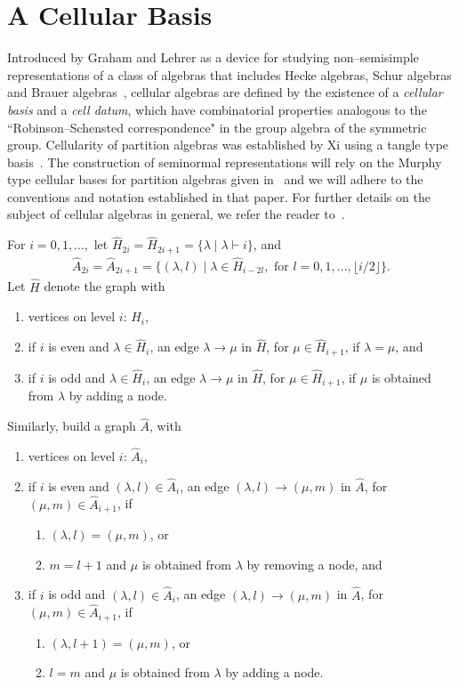 \documentclass[11pt,a4paper,reqno,svgnames]{amsart}
\theoremstyle{plain}
\theoremstyle{definition}
\numberwithin{equation}{section}
\begin{document}
\section{A Cellular Basis}\label{m-b-s}
Introduced by Graham and Lehrer as a device for studying non--semisimple representations of a class of algebras that includes Hecke algebras, Schur algebras and Brauer algebras~\cite{MR1376244}, cellular algebras are defined by the existence of a \emph{cellular basis} and a \emph{cell datum}, which have combinatorial properties analogous to the ``Robinson--Schensted correspondence" in the group algebra of the symmetric group. Cellularity of partition algebras was established by Xi using a tangle type basis~\cite[Theorem~4.1]{MR1711582}. The construction of seminormal representations will rely on the Murphy type cellular bases for partition algebras given in~\cite{EG:2012} and we will adhere to the conventions and notation established in that paper. For further details on the subject of cellular algebras in general, we refer the reader to~\cite{MR1376244, MR1711316, MR2414949, MR2794027,MR2774622}.
   
For $i=0,1,\ldots,$ let $\widehat{H}_{2i}=\widehat{H}_{2i+1}=\lbrace \lambda\mid \lambda\vdash i\rbrace$, and 
\begin{align*}
\hat{A}_{2i}=\hat{A}_{2i+1}={\lbrace}(\lambda,l)\mid\lambda\in \widehat{H}_{i-2l}, \text{ for }l=0,1,\ldots,\lfloor i/2\rfloor{\rbrace}.
\end{align*}
Let $\widehat{H}$ denote the graph with 
\begin{enumerate}
\item vertices on level $i$: $\widehat{H}_i$, 
\item if $i$ is even and $\lambda\in\widehat{H}_i$, an edge $\lambda\to \mu$ in $\widehat{H}$, for $\mu\in\widehat{H}_{i+1}$, if $\lambda=\mu$, and 
\item if $i$ is odd and $\lambda\in\widehat{H}_i$, an edge $\lambda\to \mu$ in $\widehat{H}$, for $\mu\in\widehat{H}_{i+1}$, if $\mu$ is obtained from $\lambda$ by adding a node. 
\end{enumerate}
Similarly, build a graph $\hat{A}$, with
\begin{enumerate}
\item vertices on level $i$: $\hat{A}_i$,
\item if $i$ is even and $(\lambda,l)\in\hat{A}_i$, an edge $(\lambda,{l})\to(\mu,m)$ in $\hat{A}$, for $(\mu,m)\in\hat{A}_{i+1}$, if 
\begin{enumerate}
\item $(\lambda,l)=(\mu,m)$, or 
\item $m=l+1$ and $\mu$ is obtained from $\lambda$ by removing a node, and 
\end{enumerate}
\item if $i$ is odd and $(\lambda,l)\in\hat{A}_i$, an edge $(\lambda,{l})\to(\mu,m)$ in $\hat{A}$, for $(\mu,m)\in\hat{A}_{i+1}$, if 
\begin{enumerate}
\item $(\lambda,l+1)=(\mu,m)$, or 
\item $l=m$ and $\mu$ is obtained from $\lambda$ by adding a node. 
\end{enumerate}
\end{enumerate}
\end{document}
